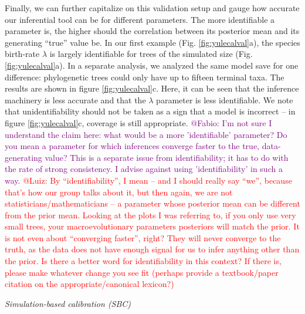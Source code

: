 \documentclass[oneside]{article}
\begin{document}
Finally, we can further capitalize on this validation setup and
gauge how accurate our inferential tool can be for different
parameters. 
The more identifiable a parameter is, the higher should the
correlation between its posterior mean and its generating ``true''
value be.
In our first example (Fig. \ref{fig:yulecalval}a), the species
birth-rate $\lambda$ is largely identifiable for trees of the
simulated size (Fig. \ref{fig:yulecalval}a).
In a separate analysis, we analyzed the same model save for one
difference: phylogenetic trees could only have up to fifteen
terminal taxa.
The results are shown in figure \ref{fig:yulecalval}c.
Here, it can be seen that the inference machinery is less accurate
and that the $\lambda$ parameter is less identifiable.
We note that unidentifiability should not be taken as a sign that
a model is incorrect -- in figure \ref{fig:yulecalval}c, coverage
is still appropriate.
\textcolor{purple}{@Fabio: I'm not sure I understand the claim here: what would be a more 'identifiable' parameter? Do you mean a parameter for which inferences converge faster to the true, data-generating value? This is a separate issue from identifiability; it has to do with the rate of strong consistency. I advise against using 'identifiability' in such a way.}
\textcolor{red}{@Luiz: By ``identifiability'', I mean -- and I should really say ``we'', because that's how our group talks about it, but then again, we are not statisticians/mathematicians -- a parameter whose posterior mean can be different from the prior mean. Looking at the plots I was referring to, if you only use very small trees, your macroevolutionary parameters posteriors will match the prior. It is not even about ``converging faster'', right? They will never converge to the truth, as the data does not have enough signal for us to infer anything other than the prior. Is there a better word for identifiability in this context? If there is, please make whatever change you see fit (perhaps provide a textbook/paper citation on the appropriate/canonical lexicon?)}

\vspace{.25cm}

\noindent \emph{Simulation-based calibration (SBC)}
\end{document}

